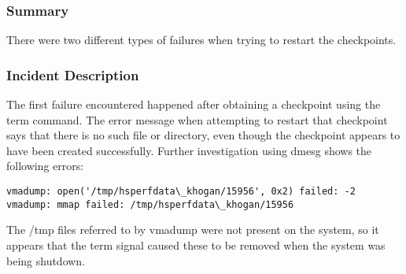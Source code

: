 







\subsubsection{Summary}
There were two different types of failures when trying to restart the checkpoints.

\subsubsection{Incident Description}
The first failure encountered happened after obtaining a checkpoint using the term command. The error message when attempting to restart that checkpoint says that there is no such file or directory, even though the checkpoint appears to have been created successfully. Further investigation using dmesg shows the following errors:
\begin{lstlisting}
vmadump: open('/tmp/hsperfdata\_khogan/15956', 0x2) failed: -2
vmadump: mmap failed: /tmp/hsperfdata\_khogan/15956
\end{lstlisting}
The /tmp files referred to by vmadump were not present on the system, so it appears that the term signal caused these to be removed when the system was being shutdown.


